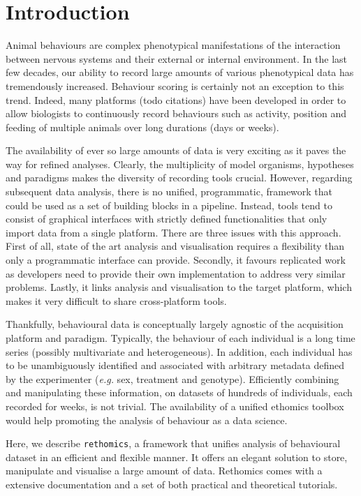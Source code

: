 \documentclass[10pt,letterpaper]{article}
\begin{document}
\linenumbers

\section*{Introduction}

Animal behaviours are complex phenotypical manifestations of the interaction between nervous systems and their external or internal environment.
In the last few decades, our ability to record large amounts of various phenotypical data has tremendously increased.
Behaviour scoring is certainly not an exception to this trend.
Indeed, many platforms (todo citations) have been developed in order to allow biologists to continuously record behaviours such as activity, position and feeding of multiple animals over long durations (days or weeks).

The availability of ever so large amounts of data is very exciting as it paves the way for refined analyses.
Clearly, the multiplicity of model organisms, hypotheses and paradigms makes the diversity of recording tools crucial.
However, regarding subsequent data analysis, there is no unified, programmatic, framework that could be used as a set of building blocks in a pipeline.
Instead, tools tend to consist of graphical interfaces with strictly defined functionalities that only import data from a single platform.
There are three issues with this approach.
First of all, state of the art analysis and visualisation requires a flexibility than only a programmatic interface can provide.
Secondly, it favours replicated work as developers need to provide their own implementation to address very similar problems.
Lastly, it links analysis and visualisation to the target platform, which makes it very difficult to share cross-platform tools.

Thankfully, behavioural data is conceptually largely agnostic of the acquisition platform and paradigm. 	
Typically, the behaviour of each individual is a long time series (possibly multivariate and heterogeneous).
In addition, each individual has to be unambiguously identified and associated with arbitrary metadata defined by the experimenter (\emph{e.g.} sex, treatment and genotype). Efficiently combining and manipulating these information, on datasets of hundreds of individuals, each recorded for weeks, is not trivial. The availability of a unified ethomics toolbox would help promoting the analysis of behaviour as a data science.

Here, we describe \texttt{rethomics}, a framework that unifies analysis of behavioural dataset in an efficient and flexible manner.
It offers an elegant solution to store, manipulate and visualise a large amount of data.
Rethomics comes with a extensive documentation and a set of both practical and theoretical tutorials.
\end{document}
